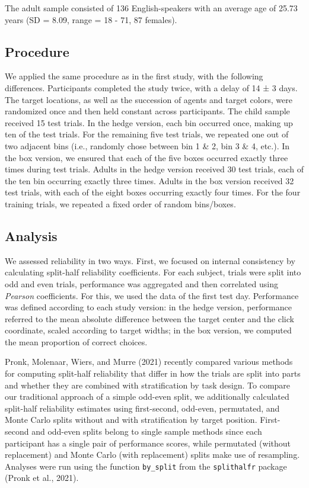 \documentclass[
  man,floatsintext]{apa6}
\begin{document}
The adult sample consisted of 136 English-speakers with an average age of 25.73 years (SD = 8.09, range = 18 - 71, 87 females).

\hypertarget{procedure-1}{%
\subsection{Procedure}\label{procedure-1}}

We applied the same procedure as in the first study, with the following differences.
Participants completed the study twice, with a delay of 14 ± 3 days.
The target locations, as well as the succession of agents and target colors, were randomized once and then held constant across participants.
The child sample received 15 test trials.
In the hedge version, each bin occurred once, making up ten of the test trials.
For the remaining five test trials, we repeated one out of two adjacent bins (i.e., randomly chose between bin 1 \& 2, bin 3 \& 4, etc.).
In the box version, we ensured that each of the five boxes occurred exactly three times during test trials.
Adults in the hedge version received 30 test trials, each of the ten bin occurring exactly three times.
Adults in the box version received 32 test trials, with each of the eight boxes occurring exactly four times.
For the four training trials, we repeated a fixed order of random bins/boxes.

\hypertarget{analysis-1}{%
\subsection{Analysis}\label{analysis-1}}

We assessed reliability in two ways.
First, we focused on internal consistency by calculating split-half reliability coefficients.
For each subject, trials were split into odd and even trials, performance was aggregated and then correlated using \emph{Pearson} coefficients.
For this, we used the data of the first test day.
Performance was defined according to each study version: in the hedge version, performance referred to the mean absolute difference between the target center and the click coordinate, scaled according to target widths; in the box version, we computed the mean proportion of correct choices.

Pronk, Molenaar, Wiers, and Murre (2021) recently compared various methods for computing split-half reliability that differ in how the trials are split into parts and whether they are combined with stratification by task design.
To compare our traditional approach of a simple odd-even split, we additionally calculated split-half reliability estimates using first-second, odd-even, permutated, and Monte Carlo splits without and with stratification by target position.
First-second and odd-even splits belong to single sample methods since each participant has a single pair of performance scores, while permutated (without replacement) and Monte Carlo (with replacement) splits make use of resampling.
Analyses were run using the function \texttt{by\_split} from the \texttt{splithalfr} package (Pronk et al., 2021).
\end{document}
